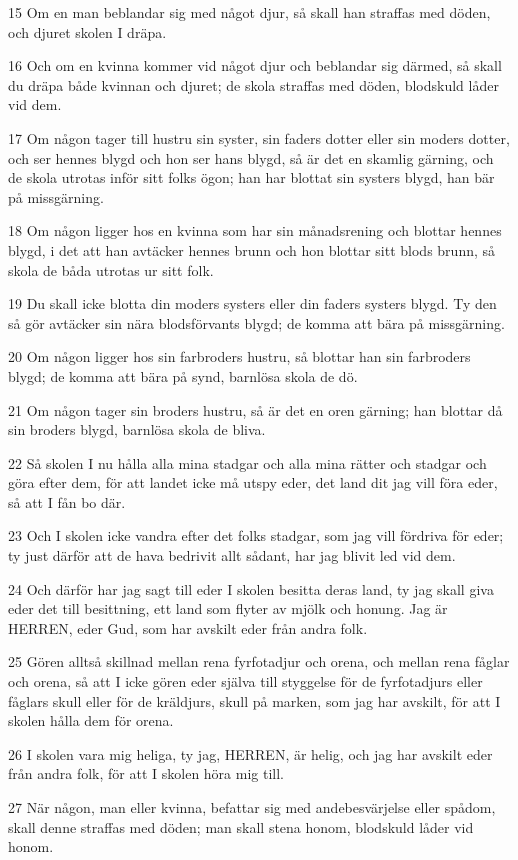 \par 15 Om en man beblandar sig med något djur, så skall han straffas med döden, och djuret skolen I dräpa.
\par 16 Och om en kvinna kommer vid något djur och beblandar sig därmed, så skall du dräpa både kvinnan och djuret; de skola straffas med döden, blodskuld låder vid dem.
\par 17 Om någon tager till hustru sin syster, sin faders dotter eller sin moders dotter, och ser hennes blygd och hon ser hans blygd, så är det en skamlig gärning, och de skola utrotas inför sitt folks ögon; han har blottat sin systers blygd, han bär på missgärning.
\par 18 Om någon ligger hos en kvinna som har sin månadsrening och blottar hennes blygd, i det att han avtäcker hennes brunn och hon blottar sitt blods brunn, så skola de båda utrotas ur sitt folk.
\par 19 Du skall icke blotta din moders systers eller din faders systers blygd. Ty den så gör avtäcker sin nära blodsförvants blygd; de komma att bära på missgärning.
\par 20 Om någon ligger hos sin farbroders hustru, så blottar han sin farbroders blygd; de komma att bära på synd, barnlösa skola de dö.
\par 21 Om någon tager sin broders hustru, så är det en oren gärning; han blottar då sin broders blygd, barnlösa skola de bliva.
\par 22 Så skolen I nu hålla alla mina stadgar och alla mina rätter och stadgar och göra efter dem, för att landet icke må utspy eder, det land dit jag vill föra eder, så att I fån bo där.
\par 23 Och I skolen icke vandra efter det folks stadgar, som jag vill fördriva för eder; ty just därför att de hava bedrivit allt sådant, har jag blivit led vid dem.
\par 24 Och därför har jag sagt till eder I skolen besitta deras land, ty jag skall giva eder det till besittning, ett land som flyter av mjölk och honung. Jag är HERREN, eder Gud, som har avskilt eder från andra folk.
\par 25 Gören alltså skillnad mellan rena fyrfotadjur och orena, och mellan rena fåglar och orena, så att I icke gören eder själva till styggelse för de fyrfotadjurs eller fåglars skull eller för de kräldjurs, skull på marken, som jag har avskilt, för att I skolen hålla dem för orena.
\par 26 I skolen vara mig heliga, ty jag, HERREN, är helig, och jag har avskilt eder från andra folk, för att I skolen höra mig till.
\par 27 När någon, man eller kvinna, befattar sig med andebesvärjelse eller spådom, skall denne straffas med döden; man skall stena honom, blodskuld låder vid honom.

